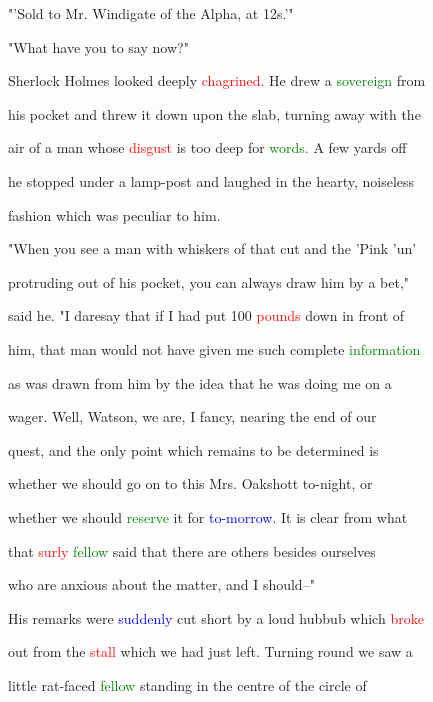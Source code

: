 "'Sold to Mr. Windigate of the Alpha, at 12s.'"



 "What have you to say now?"



 Sherlock Holmes looked deeply \textcolor{red}{chagrined.} He drew a \textcolor{green}{sovereign} from

 his pocket and threw it down upon the slab, turning away with the

 air of a man whose \textcolor{red}{disgust} is too deep for \textcolor{green}{words.} A few yards off

 he stopped under a lamp-post and \textcolor{BurntOrange}{laughed} in the hearty, noiseless

 fashion which was peculiar to him.



 "When you see a man with whiskers of that cut and the 'Pink 'un'

 protruding out of his pocket, you can always draw him by a bet,"

 said he. "I daresay that if I had put 100 \textcolor{red}{pounds} down in front of

 him, that man would not have given me such complete \textcolor{green}{information}

 as was drawn from him by the idea that he was doing me on a

 wager. Well, Watson, we are, I \textcolor{BurntOrange}{fancy,} nearing the end of our

 \textcolor{BurntOrange}{quest,} and the only point which \textcolor{BurntOrange}{remains} to be determined is

 whether we should go on to this Mrs. Oakshott to-night, or

 whether we should \textcolor{green}{reserve} it for \textcolor{blue}{to-morrow.} It is clear from what

 that \textcolor{red}{surly} \textcolor{green}{fellow} said that there are others besides ourselves

 who are \textcolor{BurntOrange}{anxious} about the matter, and I should--"



 His remarks were \textcolor{blue}{suddenly} cut short by a loud hubbub which \textcolor{red}{broke}

 out from the \textcolor{red}{stall} which we had just left. Turning round we saw a

 little rat-faced \textcolor{green}{fellow} standing in the centre of the circle of

